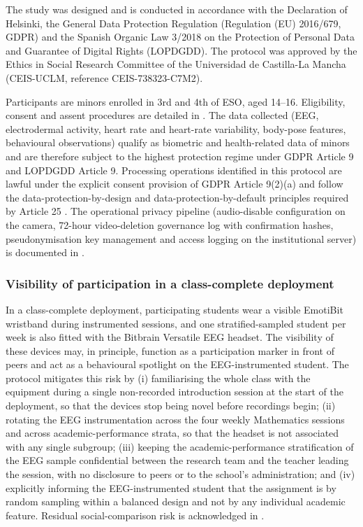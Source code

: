 The study was designed and is conducted in accordance with the Declaration of Helsinki, the General Data Protection Regulation (Regulation (EU) 2016/679, GDPR) and the Spanish Organic Law 3/2018 on the Protection of Personal Data and Guarantee of Digital Rights (LOPDGDD). The protocol was approved by the Ethics in Social Research Committee of the Universidad de Castilla-La Mancha (CEIS-UCLM, reference CEIS-738323-C7M2).

Participants are minors enrolled in 3rd and 4th of ESO, aged 14--16. Eligibility, consent and assent procedures are detailed in . The data collected (EEG, electrodermal activity, heart rate and heart-rate variability, body-pose features, behavioural observations) qualify as biometric and health-related data of minors and are therefore subject to the highest protection regime under GDPR Article 9 and LOPDGDD Article 9. Processing operations identified in this protocol are lawful under the explicit consent provision of GDPR Article 9(2)(a) and follow the data-protection-by-design and data-protection-by-default principles required by Article 25 \parencite{Macenaite2017_minors_gdpr,EDPB2020_consent}. The operational privacy pipeline (audio-disable configuration on the camera, 72-hour video-deletion governance log with confirmation hashes, pseudonymisation key management and access logging on the institutional server) is documented in .

\subsubsection{Visibility of participation in a class-complete deployment}\label{subsec:eeg-spotlight}

In a class-complete deployment, participating students wear a visible EmotiBit wristband during instrumented sessions, and one stratified-sampled student per week is also fitted with the Bitbrain Versatile EEG headset. The visibility of these devices may, in principle, function as a participation marker in front of peers and act as a behavioural spotlight on the EEG-instrumented student. The protocol mitigates this risk by (i) familiarising the whole class with the equipment during a single non-recorded introduction session at the start of the deployment, so that the devices stop being novel before recordings begin; (ii) rotating the EEG instrumentation across the four weekly Mathematics sessions and across academic-performance strata, so that the headset is not associated with any single subgroup; (iii) keeping the academic-performance stratification of the EEG sample confidential between the research team and the teacher leading the session, with no disclosure to peers or to the school's administration; and (iv) explicitly informing the EEG-instrumented student that the assignment is by random sampling within a balanced design and not by any individual academic feature. Residual social-comparison risk is acknowledged in .

